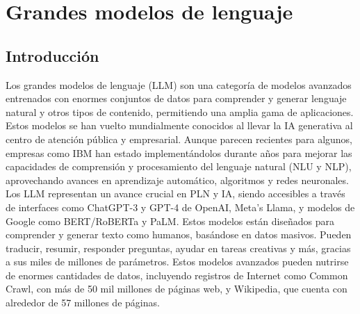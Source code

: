 \usepackage{graphicx}
\usepackage{float}
\chapter{Grandes modelos de lenguaje}



\section{Introducción}
Los grandes modelos de lenguaje (LLM) son una categoría de modelos avanzados entrenados con enormes conjuntos de datos para comprender y generar lenguaje natural y otros tipos de contenido, permitiendo una amplia gama de aplicaciones.\\

Estos modelos se han vuelto mundialmente conocidos al llevar la IA generativa al centro de atención pública y empresarial. Aunque parecen recientes para algunos, empresas como IBM han estado implementándolos durante años para mejorar las capacidades de comprensión y procesamiento del lenguaje natural (NLU y NLP), aprovechando avances en aprendizaje automático, algoritmos y redes neuronales.\\

Los LLM representan un avance crucial en PLN y IA, siendo accesibles a través de interfaces como ChatGPT-3 y GPT-4 de OpenAI, Meta's Llama, y modelos de Google como BERT/RoBERTa y PaLM.  Estos modelos están diseñados para comprender y generar texto como humanos, basándose en datos masivos. Pueden traducir, resumir, responder preguntas, ayudar en tareas creativas y más, gracias a sus miles de millones de parámetros. Estos modelos avanzados pueden nutrirse de enormes cantidades de datos, incluyendo registros de Internet como Common Crawl, con más de 50 mil millones de páginas web, y Wikipedia, que cuenta con alrededor de 57 millones de páginas.\cite{IBM-LLM}\\

